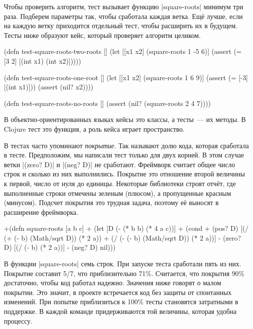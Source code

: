 
Чтобы проверить алгоритм, тест вызывает функцию \spverb|square-roots| минимум
три раза. Подберем параметры так, чтобы сработала каждая ветка. Ещё лучше, если
на каждую ветку приходится отдельный тест, чтобы расширить их в будущем. Тесты
ниже образуют кейс, который проверяет алгоритм целиком.

\begin{english}
  \begin{clojure}
(defn test-square-roots-two-roots []
  (let [[x1 x2] (square-roots 1 -5 6)]
    (assert (= [3 2] [(int x1) (int x2)]))))

(defn test-square-roots-one-root []
  (let [[x1 x2] (square-roots 1 6 9)]
    (assert (= [-3] [(int x1)]))
    (assert (nil? x2))))

(defn test-square-roots-no-roots []
  (assert (nil? (square-roots 2 4 7))))
  \end{clojure}
\end{english}

В объектно-ориентированных языках кейсы это классы, а тесты~--- их методы. В
Clojure тест это функция, а роль кейса играет пространство.


В тестах часто упоминают \emph{покрытие}. Так называют долю кода, которая
сработала в тесте. Предположим, мы написали тест только для двух корней. В этом
случае ветки \spverb|(zero? D)| и \spverb|(neg? D)| не сработают. Фреймворк
считает общее число строк и сколько из них выполнились. Покрытие это отношение
второй величины к первой, число от нуля до единицы. Некоторые библиотеки строят
отчёт, где выполненные строки отмечены зеленым (плюсом), а пропущенные красным
(минусом). Подсчет покрытия это трудная задача, поэтому её выносят в расширение
фреймворка.

\begin{english}
  \begin{diff}
+(defn square-roots [a b c]
+  (let [D (- (* b b) (* 4 a c))]
+    (cond
+      (pos? D) [(/ (+ (- b) (Math/sqrt D)) (* 2 a))
+                (/ (- (- b) (Math/sqrt D)) (* 2 a))]
-      (zero? D) [(/ (- b) (* 2 a))]
-      (neg? D) nil)))
  \end{diff}
\end{english}

В функции \spverb|square-roots| семь строк. При запуске теста сработали пять из
них. Покрытие составит 5/7, что приблизительно 71\%. Считается, что покрытия
90\% достаточно, чтобы код работал надежно. Значения ниже говорят о малом
покрытии. Это значит, в проекте встречается код без защиты от спонтанных
изменений. При попытке приблизиться к 100\% тесты становятся затратными в
поддержке. В каждой команде придерживаются той величины, которая удобна
процессу.

